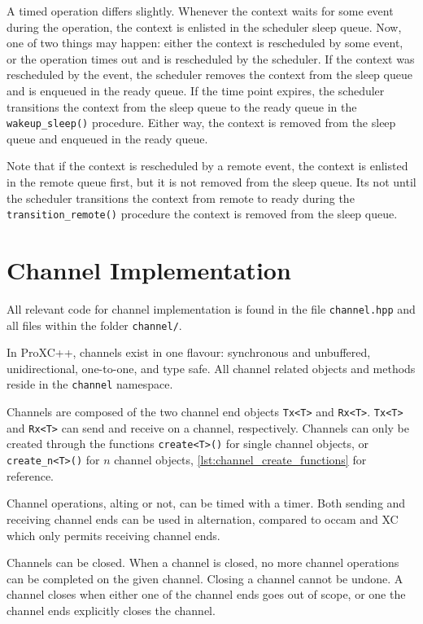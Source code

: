 A timed operation differs slightly. Whenever the context waits for some event during the operation, the context is enlisted in the scheduler sleep queue. Now, one of two things may happen: either the context is rescheduled by some event, or the operation times out and is rescheduled by the scheduler. If the context was rescheduled by the event, the scheduler removes the context from the sleep queue and is enqueued in the ready queue. If the time point expires, the scheduler transitions the context from the sleep queue to the ready queue in the \texttt{wakeup\_sleep()} procedure. Either way, the context is removed from the sleep queue and enqueued in the ready queue.

Note that if the context is rescheduled by a remote event, the context is enlisted in the remote queue first, but it is not removed from the sleep queue. Its not until the scheduler transitions the context from remote to ready during the \texttt{transition\_remote()} procedure the context is removed from the sleep queue.


\section{Channel Implementation}

All relevant code for channel implementation is found in the file \texttt{channel.hpp} and all files within the folder \texttt{channel/}.

In ProXC++, channels exist in one flavour: synchronous and unbuffered, unidirectional, one\hyp{}to\hyp{}one, and type safe. All channel related objects and methods reside in the \texttt{channel} namespace.

Channels are composed of the two channel end objects \texttt{Tx<T>} and \texttt{Rx<T>}. \texttt{Tx<T>} and \texttt{Rx<T>} can send and receive on a channel, respectively. Channels can only be created through the functions \texttt{create<T>()} for single channel objects, or \texttt{create\_n<T>()} for $n$ channel objects, \cref{lst:channel_create_functions} for reference. 

Channel operations, alting or not, can be timed with a timer. Both sending and receiving channel ends can be used in alternation, compared to occam and XC which only permits receiving channel ends.

Channels can be closed. When a channel is closed, no more channel operations can be completed on the given channel. Closing a channel cannot be undone. A channel closes when either one of the channel ends goes out of scope, or one the channel ends explicitly closes the channel.

